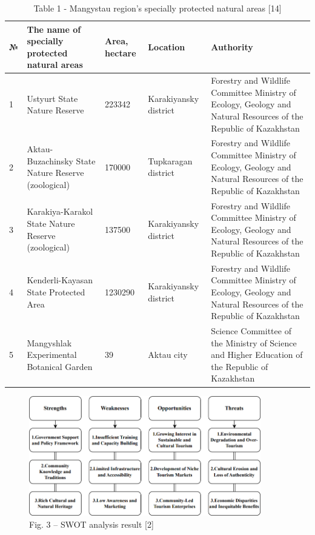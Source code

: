 \begin{table}[H]
\caption*{Table 1 - Mangystau region's specially protected natural areas {[}14{]}}
\centering
\begin{tabular}{|l|p{}|p{}|p{}|p{}|}
\hline
№ & The name of specially protected natural areas & Area, hectare & Location & Authority \\ \hline
1 &
  Ustyurt State Nature Reserve &
  223342 &
  Karakiyansky district &
  Forestry and Wildlife Committee Ministry of Ecology, Geology and Natural Resources of the Republic of Kazakhstan \\ \hline
2 &
  Aktau-Buzachinsky State Nature Reserve (zoological) &
  170000 &
  Tupkaragan district &
  Forestry and Wildlife Committee Ministry of Ecology, Geology and Natural Resources of the Republic of Kazakhstan \\ \hline
3 &
  Karakiya-Karakol State Nature Reserve (zoological) &
  137500 &
  Karakiyansky district &
  Forestry and Wildlife Committee Ministry of Ecology, Geology and Natural Resources of the Republic of Kazakhstan \\ \hline
4 &
  Kenderli-Kayasan State Protected Area &
  1230290 &
  Karakiyansky district &
  Forestry and Wildlife Committee Ministry of Ecology, Geology and Natural Resources of the Republic of Kazakhstan \\ \hline
5 &
  Mangyshlak Experimental Botanical Garden &
  39 &
  Aktau city &
  Science Committee of the Ministry of Science and Higher Education of the Republic of Kazakhstan \\ \hline
\end{tabular}
\end{table}

\begin{figure}[H]
	\centering
	\includegraphics[width=0.9\textwidth]{assets/339}
	\caption*{Fig. 3 -- SWOT analysis result {[}2{]}}
\end{figure}

